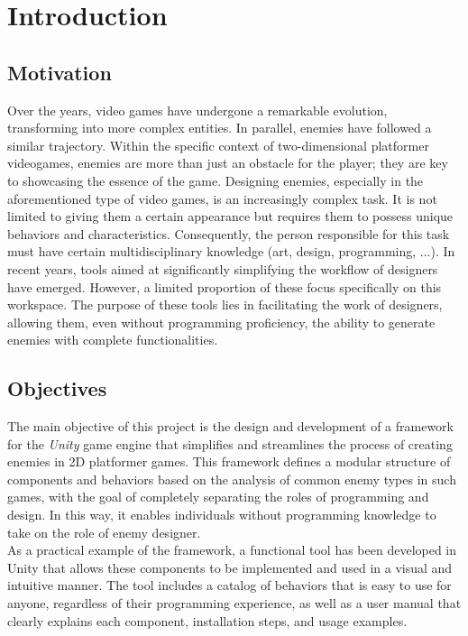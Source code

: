 \chapter*{Introduction}
\label{cap:introduction}


\section{Motivation}
Over the years, video games have undergone a remarkable evolution, transforming into more complex entities. In parallel, enemies have followed a similar trajectory. Within the specific context of two-dimensional platformer videogames, enemies are more than just an obstacle for the player; they are key to showcasing the essence of the game. Designing enemies, especially in the aforementioned type of video games, is an increasingly complex task. It is not limited to giving them a certain appearance but requires them to possess unique behaviors and characteristics. Consequently, the person responsible for this task must have certain multidisciplinary knowledge (art, design, programming, ...).
In recent years, tools aimed at significantly simplifying the workflow of designers have emerged. However, a limited proportion of these focus specifically on this workspace. The purpose of these tools lies in facilitating the work of designers, allowing them, even without programming proficiency, the ability to generate enemies with complete functionalities.

\section{Objectives}
The main objective of this project is the design and development of a framework for the \textit{Unity} game engine that simplifies and streamlines the process of creating enemies in 2D platformer games. This framework defines a modular structure of components and behaviors based on the analysis of common enemy types in such games, with the goal of completely separating the roles of programming and design. In this way, it enables individuals without programming knowledge to take on the role of enemy designer.\\

As a practical example of the framework, a functional tool has been developed in Unity that allows these components to be implemented and used in a visual and intuitive manner. The tool includes a catalog of behaviors that is easy to use for anyone, regardless of their programming experience, as well as a user manual that clearly explains each component, installation steps, and usage examples.\\

